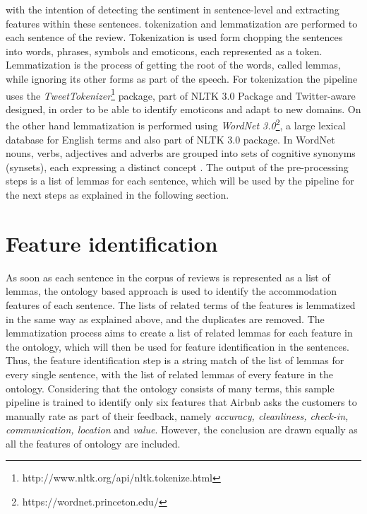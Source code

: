 with the intention of detecting the sentiment in sentence-level and extracting features within these sentences. {\color {red}{For splitting the reviews into sentences, the pipeline uses the NLTK Data package which is based in English punctuation marks.  From this steps results that a review has on average 5.1 sentences, where the maximum number of sentences per review found is 41 sentences. The total number of sentences in English that form the dataset is 301 081 sentences. For all of them}} tokenization and lemmatization are performed to each sentence of the review. Tokenization is used form chopping the sentences into words, phrases, symbols and emoticons, each represented as a token. Lemmatization is the process of getting the root of the words, called lemmas, while ignoring its other forms as part of the speech. For tokenization the pipeline uses the \textit{TweetTokenizer}\footnote{http://www.nltk.org/api/nltk.tokenize.html} package, part of NLTK 3.0 Package and Twitter-aware designed, in order to be able to identify emoticons and adapt to new domains. On the other hand lemmatization is performed using \textit{WordNet 3.0}\footnote{https://wordnet.princeton.edu/}, a large lexical database for English terms and also part of NLTK 3.0 package. In WordNet nouns, verbs, adjectives and adverbs are grouped into sets of cognitive synonyms (synsets), each expressing a distinct concept \cite{miller1995wordnet}. The output of the pre-processing steps is a list of lemmas for each sentence, which will be used by the pipeline for the next steps as explained in the following section.  
%
\section{Feature identification}
As soon as each sentence in the corpus of reviews is represented as a list of lemmas, the ontology based approach is used to identify the accommodation features of each sentence.  The lists of related terms of the features is lemmatized in the same way as explained above, and the duplicates are removed. The lemmatization process aims to create a list of related lemmas for each feature in the ontology, which will then be used for feature identification in the sentences.
Thus, the feature identification step is a string match of the list of lemmas for every single sentence, with the list of related lemmas of every feature in the ontology. Considering that the ontology consists of many terms, this sample pipeline is trained to identify only six features that Airbnb asks the customers to manually rate as part of their feedback, namely \textit{accuracy, cleanliness, check-in, communication, location} and \textit{value}. However, the conclusion are drawn equally as all the features of ontology are included. 

